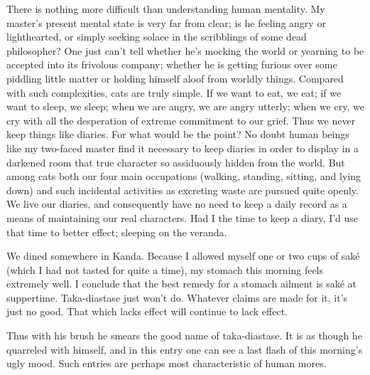 \documentclass[12pt, openright]{book}
\begin{document}
There is nothing more difficult than understanding human mentality. My
master's present mental state is very far from clear; is he feeling
angry or lighthearted, or simply seeking solace in the scribblings of
some dead philosopher? One just can't tell whether he's mocking the
world or yearning to be accepted into its frivolous company; whether he
is getting furious over some piddling little matter or holding himself
aloof from worldly things. Compared with such complexities, cats are
truly simple. If we want to eat, we eat; if we want to sleep, we sleep;
when we are angry, we are angry utterly; when we cry, we cry with all
the desperation of extreme commitment to our grief. Thus we never keep
things like diaries. For what would be the point? No doubt human beings
like my two-faced master find it necessary to keep diaries in order to
display in a darkened room that true character so assiduously hidden
from the world. But among cats both our four main occupations (walking,
standing, sitting, and lying down) and such incidental activities as
excreting waste are pursued quite openly. We live our diaries, and
consequently have no need to keep a daily record as a means of
maintaining our real characters. Had I the time to keep a diary, I'd use
that time to better effect; sleeping on the veranda.

We dined somewhere in Kanda. Because I allowed myself one or two cups of
saké (which I had not tasted for quite a time), my stomach this morning
feels extremely well. I conclude that the best remedy for a stomach
ailment is saké at suppertime. Taka-diastase just won't do. Whatever
claims are made for it, it's just no good. That which lacks effect will
continue to lack effect.

Thus with his brush he smears the good name of taka-diastase. It is as
though he quarreled with himself, and in this entry one can see a last
flash of this morning's ugly mood. Such entries are perhaps most
characteristic of human mores.
\end{document}
